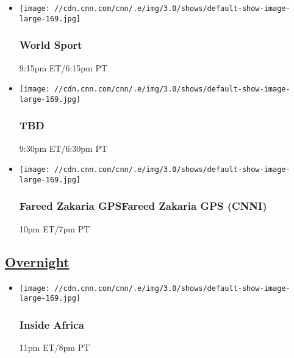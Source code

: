 \begin{itemize}
\item
  \texttt{[image: //cdn.cnn.com/cnn/.e/img/3.0/shows/default-show-image-large-169.jpg]}

  \hypertarget{world-sport-8}{%
  \subsubsection{World Sport}\label{world-sport-8}}

  9:15pm ET/6:15pm PT
\end{itemize}

\begin{itemize}
\item
  \texttt{[image: //cdn.cnn.com/cnn/.e/img/3.0/shows/default-show-image-large-169.jpg]}

  \hypertarget{tbd-5}{%
  \subsubsection{TBD}\label{tbd-5}}

  9:30pm ET/6:30pm PT
\end{itemize}

\begin{itemize}
\item
  \texttt{[image: //cdn.cnn.com/cnn/.e/img/3.0/shows/default-show-image-large-169.jpg]}

  \hypertarget{fareed-zakaria-gpsfareed-zakaria-gps-cnni--3}{%
  \subsubsection{Fareed Zakaria GPSFareed Zakaria GPS (CNNI)
  }\label{fareed-zakaria-gpsfareed-zakaria-gps-cnni--3}}

  10pm ET/7pm PT
\end{itemize}

\hypertarget{overnight--1}{%
\subsection{\texorpdfstring{\href{/tv/schedule/cnn/index.html}{Overnight}~}{Overnight~}}\label{overnight--1}}

\begin{itemize}
\item
  \texttt{[image: //cdn.cnn.com/cnn/.e/img/3.0/shows/default-show-image-large-169.jpg]}

  \hypertarget{inside-africa-5}{%
  \subsubsection{Inside Africa}\label{inside-africa-5}}

  11pm ET/8pm PT
\end{itemize}

